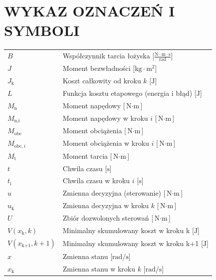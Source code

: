 \chapter*{WYKAZ OZNACZEŃ I SYMBOLI}
{}
\setlength{\parindent}{0cm}

\begin{tabular}{ll}
    $B$                         & Współczynnik tarcia łożyska [$\frac{\text{N}\cdot\text{m}\cdot\text{s}}{\text{rad}}$] \\
    $J$                         & Moment bezwładności [$\text{kg}\cdot\text{m}^2$] \\
    $J_{\text{k}}$              & Koszt całkowity od kroku $k$ [$\text{J}$] \\
    $L$                         & Funkcja kosztu etapowego (energia i błąd) [$\text{J}$] \\
    $M_{\text{n}}$              & Moment napędowy [$\text{N}\cdot\text{m}$] \\
    $M_{\text{n,i}}$            & Moment napędowy w kroku $i$ [$\text{N}\cdot\text{m}$] \\
    $M_{\text{obc}}$            & Moment obciążenia [$\text{N}\cdot\text{m}$] \\
    $M_{\text{obc},i}$          & Moment obciążenia w kroku $i$ [$\text{N}\cdot\text{m}$] \\
    $M_{\text{t}}$              & Moment tarcia [$\text{N}\cdot\text{m}$] \\
    $t$                         & Chwila czasu [$\text{s}$] \\
    $t_{\text{i}}$              & Chwila czasu w kroku $i$ [$\text{s}$] \\
    $u$                         & Zmienna decyzyjna (sterowanie) [$\text{N}\cdot\text{m}$] \\
    $u_{\text{k}}$              & Zmienna decyzyjna w kroku $k$ [$\text{N}\cdot\text{m}$] \\
    $U$                         & Zbiór dozwolonych sterowań [$\text{N}\cdot\text{m}$] \\
    $V(x_{\text{k}}, k)$        & Minimalny skumulowany koszt w kroku k [$\text{J}$] \\
    $V(x_{\text{k+1}}, k+1)$    & Minimalny skumulowany koszt w kroku k+1 [$\text{J}$] \\
    $x$                         & Zmienna stanu [$\text{rad/s}$] \\
    $x_{\text{k}}$              & Zmienna stanu w kroku $k$ [$\text{rad/s}$] \\

\end{tabular}
